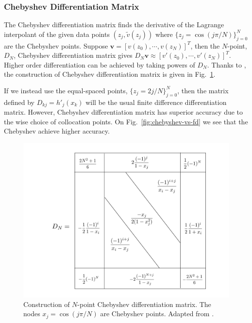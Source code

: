 \subsubsection*{Chebyshev Differentiation Matrix}
The Chebyshev differentiation matrix finds the derivative of the Lagrange interpolant of the given data points $(z_j,\tilde{v}(z_j))$ where $\{z_j = \cos(j\pi/N)\}_{j=0}^{N}$ are the Chebyshev points. Suppose $\mathbf{v} = [v(z_0), \cdots, v(z_N)]^T$, then the $N$-point, $D_N$, Chebyshev differentiation matrix gives $D_N\mathbf{v} \approx [v'(z_0),\cdots, v'(z_N)]^T$. Higher order differentiation can be achieved by taking powers of $D_N$. Thanks to \cite{trefethen_spectral_2000}, the construction of Chebyshev differentiation matrix is given in Fig.~\ref{fig:chebyshev-differentiation-matrix}.

If we instead use the equal-spaced points, $\{z_j=2j/N\}_{j=0}^{N}$, then the matrix defined by $D_{kj} = h'_j(x_k)$ will be the usual finite difference differentiation matrix. However, Chebyshev differentiation matrix has superior accuracy due to the wise choice of collocation points. On Fig.~\ref{fig:chebyshev-vs-fd} we see that the Chebyshev achieve higher accuracy.

\begin{figure} [htbp]
	\centering
	\includegraphics[width=\textwidth]{figures/chebyshev-differentiation-matrix.png}
	\caption{Construction of $N$-point Chebyshev differentiation matrix. The nodes $x_j = \cos(j\pi/N)$ are Chebyshev points. Adapted from \cite{trefethen_spectral_2000}.}
	\label{fig:chebyshev-differentiation-matrix}
\end{figure}


